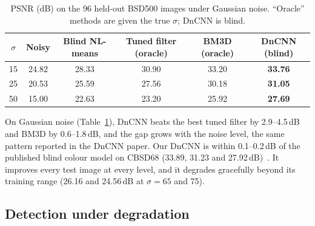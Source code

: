 \documentclass[11pt]{article}
\newcommand{\tabref}[1]{Table~\ref{#1}}
\begin{document}
\begin{table}[t]
\centering\small
\caption{PSNR (dB) on the 96 held-out BSD500 images under Gaussian noise. ``Oracle'' methods are given the true $\sigma$; DnCNN is blind.}
\label{tab:psnr}
\begin{tabular}{@{}cccccc@{}}
\toprule
$\sigma$ & Noisy & Blind NL-means & Tuned filter (oracle) & BM3D (oracle) & DnCNN (blind) \\
\midrule
15 & 24.82 & 28.33 & 30.90 & 33.20 & \textbf{33.76} \\
25 & 20.53 & 25.59 & 27.56 & 30.18 & \textbf{31.05} \\
50 & 15.00 & 22.63 & 23.20 & 25.92 & \textbf{27.69} \\
\bottomrule
\end{tabular}
\end{table}

On Gaussian noise (\tabref{tab:psnr}), DnCNN beats the best tuned filter by 2.9--4.5\,dB and BM3D by 0.6--1.8\,dB, and the gap grows with the noise level, the same pattern reported in the DnCNN paper. Our DnCNN is within 0.1--0.2\,dB of the published blind colour model on CBSD68 (33.89, 31.23 and 27.92\,dB)~\citep{zhang2017dncnn}. It improves every test image at every level, and it degrades gracefully beyond its training range (26.16 and 24.56\,dB at $\sigma = 65$ and 75).

\subsection{Detection under degradation}
\label{sec:det}
\end{document}
